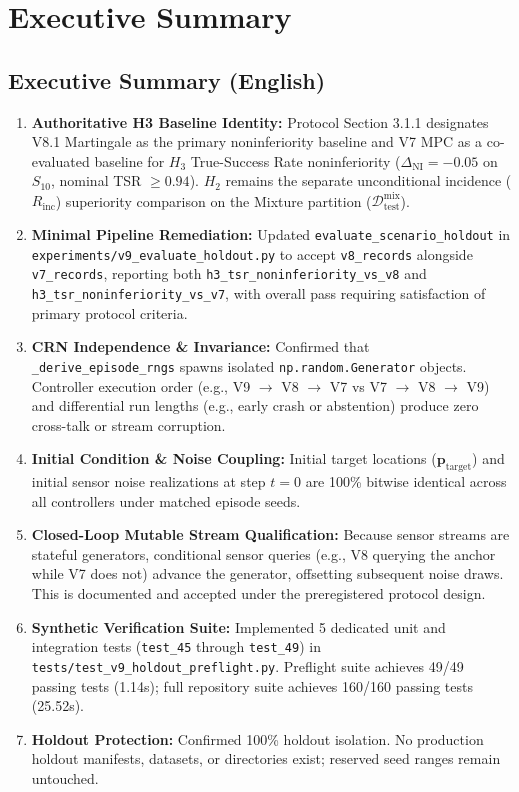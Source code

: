 \documentclass[10pt,a4paper]{article}
\begin{document}
\section{Executive Summary}

\subsection{Executive Summary (English)}
\begin{enumerate}
    \item \textbf{Authoritative H3 Baseline Identity:} Protocol Section 3.1.1 designates V8.1 Martingale as the primary noninferiority baseline and V7 MPC as a co-evaluated baseline for $H_3$ True-Success Rate noninferiority ($\Delta_{\mathrm{NI}} = -0.05$ on $S_{10}$, nominal TSR $\ge 0.94$). $H_2$ remains the separate unconditional incidence ($R_{\mathrm{inc}}$) superiority comparison on the Mixture partition ($\mathcal{D}_{\text{test}}^{\text{mix}}$).
    \item \textbf{Minimal Pipeline Remediation:} Updated \texttt{evaluate\_scenario\_holdout} in \texttt{experiments/v9\_evaluate\_holdout.py} to accept \texttt{v8\_records} alongside \texttt{v7\_records}, reporting both \texttt{h3\_tsr\_noninferiority\_vs\_v8} and \texttt{h3\_tsr\_noninferiority\_vs\_v7}, with overall pass requiring satisfaction of primary protocol criteria.
    \item \textbf{CRN Independence \& Invariance:} Confirmed that \texttt{\_derive\_episode\_rngs} spawns isolated \texttt{np.random.Generator} objects. Controller execution order (e.g., V9 $\to$ V8 $\to$ V7 vs V7 $\to$ V8 $\to$ V9) and differential run lengths (e.g., early crash or abstention) produce zero cross-talk or stream corruption.
    \item \textbf{Initial Condition \& Noise Coupling:} Initial target locations ($\mathbf{p}_{\mathrm{target}}$) and initial sensor noise realizations at step $t=0$ are 100\% bitwise identical across all controllers under matched episode seeds.
    \item \textbf{Closed-Loop Mutable Stream Qualification:} Because sensor streams are stateful generators, conditional sensor queries (e.g., V8 querying the anchor while V7 does not) advance the generator, offsetting subsequent noise draws. This is documented and accepted under the preregistered protocol design.
    \item \textbf{Synthetic Verification Suite:} Implemented 5 dedicated unit and integration tests (\texttt{test\_45} through \texttt{test\_49}) in \texttt{tests/test\_v9\_holdout\_preflight.py}. Preflight suite achieves 49/49 passing tests (1.14s); full repository suite achieves 160/160 passing tests (25.52s).
    \item \textbf{Holdout Protection:} Confirmed 100\% holdout isolation. No production holdout manifests, datasets, or directories exist; reserved seed ranges remain untouched.
\end{enumerate}
\end{document}
